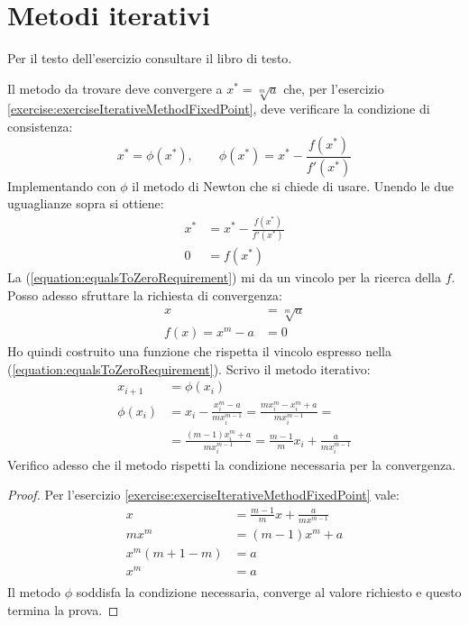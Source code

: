 \section{Metodi iterativi}

\begin{exercise}[2.2]
	Per il testo dell'esercizio consultare il libro di testo.
\end{exercise}
Il metodo da trovare deve convergere a $x^{*} = \sqrt[m]{a}$ che, per l'esercizio
\ref{exercise:exerciseIterativeMethodFixedPoint}, deve verificare la condizione 
di consistenza:
\begin{displaymath}
	x^{*}=\phi(x^{*}), \quad \quad \phi(x^{*}) = x^{*} - 
		\frac{f(x^{*})}{f'(x^{*})}
\end{displaymath}
Implementando con $\phi$ il metodo di Newton che si chiede di usare.
Unendo le due uguaglianze sopra si ottiene:
\begin{equation}
\label{equation:equalsToZeroRequirement}
\begin{split}
	x^{*} &= x^{*} - \frac{f(x^{*})}{f'(x^{*})} \\
	0 &= f(x^{*})
\end{split}
\end{equation}
La (\ref{equation:equalsToZeroRequirement}) mi da un vincolo per la ricerca
della $f$. Posso adesso sfruttare la richiesta di convergenza:
\begin{equation}
\begin{split}
	x &= \sqrt[m]{a} \\
	f(x) = x^{m} - a &= 0
\end{split}
\end{equation}
Ho quindi costruito una funzione che rispetta il vincolo espresso nella
(\ref{equation:equalsToZeroRequirement}). Scrivo il metodo iterativo:
\begin{displaymath}
\begin{split}
	x_{i+1} &=\phi(x_{i}) \\
	\phi(x_{i}) &= x_{i} - 
		\frac{x_{i}^{m} - a}{m x_{i}^{m - 1}} = 
		\frac{m x_{i}^{m} - x_{i}^{m} + a}{m x_{i}^{m - 1}} = \\
	&= 	\frac{(m - 1) x_{i}^{m} + a}{m x_{i}^{m - 1}} = 
			\frac{m - 1}{m} x_{i} + \frac{a}{m x_{i}^{m - 1}}
\end{split}
\end{displaymath}
Verifico adesso che il metodo rispetti la condizione necessaria per la convergenza.
\begin{proof}
Per l'esercizio \ref{exercise:exerciseIterativeMethodFixedPoint} vale:
\begin{equation}
\begin{split}
	x &= \frac{m - 1}{m} x + \frac{a}{m x^{m - 1}} \\
	m x^{m} &= (m - 1) x^{m} + a \\
	x^{m} (m + 1 - m) &= a \\
	x^{m} &= a \\
\end{split}
\end{equation}
Il metodo $\phi$ soddisfa la condizione necessaria, converge al valore
richiesto e questo termina la prova.
\end{proof}

